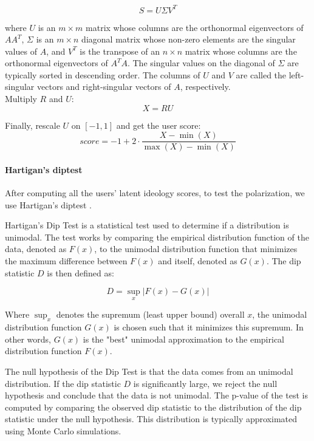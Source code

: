 \begin{equation}
S = U\Sigma V^T
\end{equation}

where $U$ is an $m \times m$ matrix whose columns are the orthonormal eigenvectors of $AA^T$, $\Sigma$ is an $m \times n$ diagonal matrix whose non-zero elements are the singular values of $A$, and $V^T$ is the transpose of an $n \times n$ matrix whose columns are the orthonormal eigenvectors of $A^T A$. The singular values on the diagonal of $\Sigma$ are typically sorted in descending order. The columns of $U$ and $V$ are called the left-singular vectors and right-singular vectors of $A$, respectively.
\\

Multiply $R$ and $U$:
\begin{equation}
X = R U
\end{equation}

Finally, rescale $U$ on $[-1,1]$ and get the user score:
\begin{equation}
score = -1 + 2 \cdot \frac{{X} - \min(X)}{\max(X) - \min(X)}
\end{equation}








\paragraph{Hartigan's diptest}

After computing all the users' latent ideology scores, to test the polarization, we use Hartigan's diptest \cite{hartigan_dip_1985}.

Hartigan's Dip Test is a statistical test used to determine if a distribution is unimodal. The test works by comparing the empirical distribution function of the data, denoted as $F(x)$, to the unimodal distribution function that minimizes the maximum difference between $F(x)$ and itself, denoted as $G(x)$. The dip statistic $D$ is then defined as:

\begin{equation}
D = \sup_x |F(x) - G(x)|
\end{equation}

Where $\sup_x$ denotes the supremum (least upper bound) overall $x$, the unimodal distribution function $G(x)$ is chosen such that it minimizes this supremum. In other words, $G(x)$ is the "best" unimodal approximation to the empirical distribution function $F(x)$.

The null hypothesis of the Dip Test is that the data comes from an unimodal distribution. If the dip statistic $D$ is significantly large, we reject the null hypothesis and conclude that the data is not unimodal. The p-value of the test is computed by comparing the observed dip statistic to the distribution of the dip statistic under the null hypothesis. This distribution is typically approximated using Monte Carlo simulations.